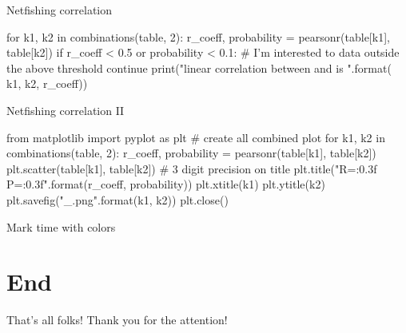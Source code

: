 \begin{frame}[fragile]{Netfishing correlation}
\begin{pythoncode}
for k1, k2 in combinations(table, 2):
    r_coeff, probability = pearsonr(table[k1], table[k2])
    if r_coeff < 0.5 or probability < 0.1:
        # I'm interested to data outside the above threshold
        continue
    print("linear correlation between {} and {} is {}".format(
        k1, k2, r_coeff))

\end{pythoncode}
\end{frame}

\begin{frame}[fragile]{Netfishing correlation II}
\begin{pythoncode}
from matplotlib import pyplot as plt
# create all combined plot
for k1, k2 in combinations(table, 2):
    r_coeff, probability = pearsonr(table[k1], table[k2])
    plt.scatter(table[k1], table[k2])
    # 3 digit precision on title
    plt.title("R={:0.3f} P={:0.3f}".format(r_coeff, probability))
    plt.xtitle(k1) 
    plt.ytitle(k2)
    plt.savefig("{}_{}.png".format(k1, k2))
    plt.close()
\end{pythoncode}
\end{frame}


\begin{frame}[fragile]{Mark time with colors}
\end{frame}

\section{End}
\begin{frame}[fragile]{That's all folks!}
Thank you for the attention!
\end{frame}


